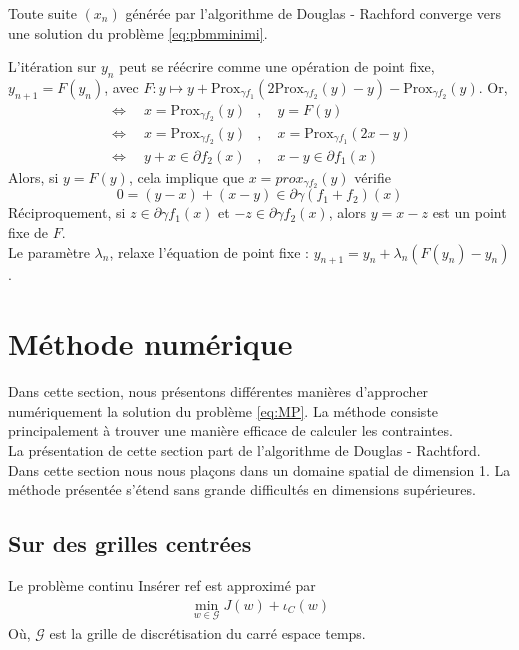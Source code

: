 \documentclass[a4paper,12pt]{article}
\newcommand{\prox}{\text{Prox}}
\begin{document}
\begin{propriete}
Toute suite $(x_n)$ générée par l'algorithme de Douglas - Rachford converge vers une solution du problème \ref{eq:pbmminimi}.
\end{propriete}

\begin{preuve}
L'itération sur $y_n$ peut se réécrire comme une opération de point fixe, $y_{n+1}=F(y_n)$, avec $F:y\mapsto y+\prox_{\gamma f_1}(2\prox_{\gamma f_2}(y)-y)-\prox_{\gamma f_2}(y)$. Or, 
\begin{align*}
\Longleftrightarrow\quad x=\prox_{\gamma f_2}(y) &,\quad y = F(y) \\
\Longleftrightarrow\quad x=\prox_{\gamma f_2}(y) &,\quad x = \prox_{\gamma f_1}(2x-y) \\
\Longleftrightarrow\quad y+x\in\partial f_2(x)   &, \quad x-y\in\partial f_1(x)
\end{align*}
Alors, si $y=F(y)$, cela implique que $x=prox_{\gamma f_2}(y)$ vérifie 
$$
0=(y-x)+(x-y)\in \partial\gamma(f_1+f_2)(x)
$$
Réciproquement, si $z\in\partial \gamma f_1(x)$ et $-z\in\partial \gamma f_2(x)$, alors $y=x-z$ est un point fixe de $F$.\\

Le paramètre $\lambda_n$, relaxe l'équation de point fixe : $y_{n+1}=y_n + \lambda_n(F(y_n)-y_n)$. 
\end{preuve}






\newpage

\section{Méthode numérique}
\label{sec:numerique}
Dans cette section, nous présentons différentes manières d'approcher numériquement la solution du problème \eqref{eq:MP}. La méthode consiste principalement à trouver une manière efficace de calculer les contraintes. \\

La présentation de cette section part de l'algorithme de Douglas - Rachtford. \\

Dans cette section nous nous plaçons dans un domaine spatial de dimension 1. La méthode présentée s'étend sans grande difficultés en dimensions supérieures. 


\subsection{Sur des grilles centrées}
Le problème continu {\Huge Insérer ref} est approximé par 
\begin{align}
\min_{w\in\mathcal{G}} J(w) + \iota_C(w)
\end{align}
Où, $\mathcal{G}$ est la grille de discrétisation du carré espace temps. 
\end{document}
